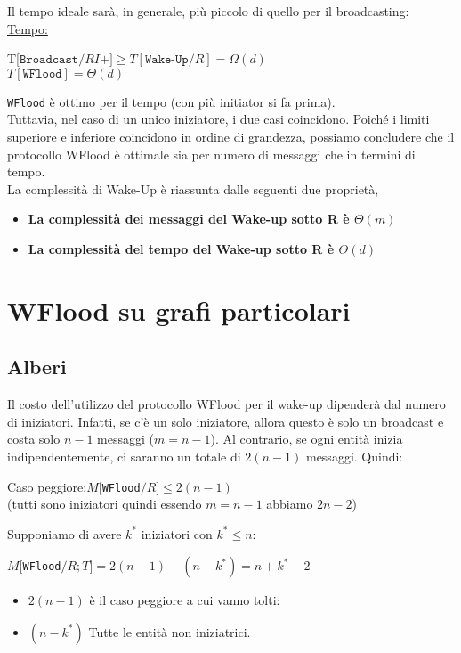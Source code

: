 Il tempo ideale sarà, in generale, più piccolo di quello per il broadcasting:\\
\underline{Tempo:}
\begin{center}
    T[$\texttt{Broadcast}/RI+] \geq T[\texttt{Wake-Up}/R] = \Omega(d)$\\
    $T[\texttt{WFlood}] = \Theta(d)$\\
\end{center}
\texttt{WFlood} è ottimo per il tempo (con più initiator si fa prima).\\

Tuttavia, nel caso di un unico iniziatore, i due casi coincidono. Poiché i
limiti superiore e inferiore coincidono in ordine di grandezza, possiamo
concludere che il protocollo WFlood è ottimale sia per numero di messaggi che in
termini di tempo.\\
La complessità di Wake-Up è riassunta dalle seguenti due proprietà,
\begin{itemize}
    \item \textbf{La complessità dei messaggi del Wake-up sotto R è $\Theta(m)$}
    \item \textbf{La complessità del tempo del Wake-up sotto R è $\Theta(d)$}\\
\end{itemize}

\section{WFlood su grafi particolari}
\subsection{Alberi}
Il costo dell'utilizzo del protocollo WFlood per il wake-up dipenderà dal numero
di iniziatori. Infatti, se c'è un solo iniziatore, allora questo è solo un
broadcast e costa solo $n - 1$ messaggi ($m=n-1$). Al contrario, se ogni entità
inizia indipendentemente, ci saranno un totale di $2(n - 1)$ messaggi. Quindi:
\begin{center}
    Caso peggiore:$M[$\texttt{WFlood}$/R] \leq 2(n-1)$ \\
    (tutti sono iniziatori quindi essendo $m = n-1$ abbiamo $2 n-2$)
\end{center}
Supponiamo di avere $k^*$ iniziatori con $k^* \leq n$:
\begin{center}
    $M[$\texttt{WFlood}$/R;T]= 2(n-1) - (n-k^*) = n+k^*-2$\\
    \begin{itemize}
        \item $2(n-1)$ è il caso peggiore a cui vanno tolti:
        \item $(n-k^*)$ Tutte le entità non iniziatrici.
    \end{itemize}
\end{center}

